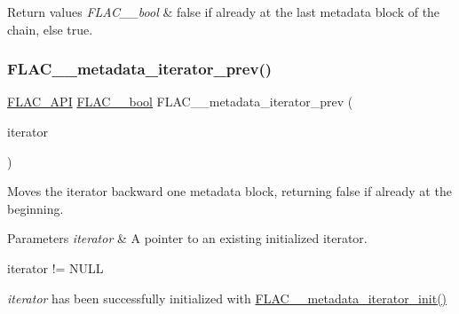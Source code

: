 \begin{DoxyRetVals}{Return values}
{\em F\+L\+A\+C\+\_\+\+\_\+bool} & {\ttfamily false} if already at the last metadata block of the chain, else {\ttfamily true}. \\
\hline
\end{DoxyRetVals}
\mbox{\label{group__flac__metadata__level2_ga003373a88bea6cea2df32f110a95e912}} 
\subsubsection{\texorpdfstring{F\+L\+A\+C\+\_\+\+\_\+metadata\+\_\+iterator\+\_\+prev()}{FLAC\_\_metadata\_iterator\_prev()}}
{\footnotesize\ttfamily \hyperlink{group__flac__export_ga56ca07df8a23310707732b1c0007d6f5}{F\+L\+A\+C\+\_\+\+A\+PI} \hyperlink{ordinals_8h_a95103469f1cbd78b8cf250194985b34e}{F\+L\+A\+C\+\_\+\+\_\+bool} F\+L\+A\+C\+\_\+\+\_\+metadata\+\_\+iterator\+\_\+prev (\begin{DoxyParamCaption}\item[{\hyperlink{group__flac__metadata__level2_ga9f3e135a07cdef7e51597646aa7b89b2}{F\+L\+A\+C\+\_\+\+\_\+\+Metadata\+\_\+\+Iterator} $\ast$}]{iterator }\end{DoxyParamCaption})}

Moves the iterator backward one metadata block, returning {\ttfamily false} if already at the beginning.


\begin{DoxyParams}{Parameters}
{\em iterator} & A pointer to an existing initialized iterator.  
\begin{DoxyCode}
iterator != NULL 
\end{DoxyCode}
 {\itshape iterator} has been successfully initialized with \hyperlink{group__flac__metadata__level2_ga4a5af69a1f19436b02f738eb8c97c959}{F\+L\+A\+C\+\_\+\+\_\+metadata\+\_\+iterator\+\_\+init()} \\
\hline
\end{DoxyParams}

